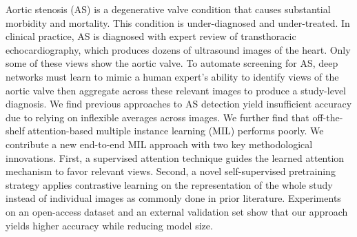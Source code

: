Aortic stenosis (AS) is a degenerative valve condition that causes substantial morbidity and mortality. This condition is under-diagnosed and under-treated. In clinical practice, AS is diagnosed with expert review of transthoracic echocardiography, which produces dozens of ultrasound images of the heart. Only some of these views show the aortic valve. To automate screening for AS, deep networks must learn to mimic a human expert’s ability to identify views of the aortic valve then aggregate across these relevant images to produce a study-level diagnosis. We find previous approaches to AS detection yield insufficient accuracy due to relying on inflexible averages across images. We further find that off-the-shelf attention-based multiple instance learning (MIL) performs poorly. We contribute a new end-to-end MIL approach with two key methodological innovations. First, a supervised attention technique guides the learned attention mechanism to favor relevant views. Second, a novel self-supervised pretraining strategy applies contrastive learning on the representation of the whole study instead of individual images as commonly done in prior literature. Experiments on an open-access dataset and an external validation set show that our approach yields higher accuracy while reducing model size.




